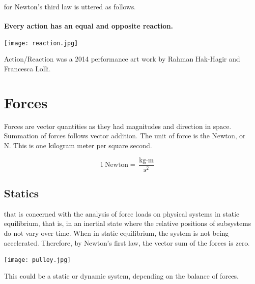 
 for Newton's third law is uttered as follows.\\ \ \\ \textbf{Every action has an equal and opposite reaction.}

\begin{marginfigure}[-40pt]%
  \texttt{[image: reaction.jpg]}
  \caption{Action/Reaction was a 2014 performance art work by Rahman Hak-Hagir and Francesca Lolli.}
  \label{fig:marginfig}
\end{marginfigure}


\newpage

\section{Forces}
Forces are vector quantities as they had magnitudes and direction in space.  Summation of forces follows vector addition.   The unit of force is the Newton, or N.  This is one kilogram meter per square second.  


$$1\ \text{Newton}=\frac{\text{kg}\cdot\text{m}}{\text{s}^2}$$



\subsection{Statics}
 that is concerned with the analysis of force loads on physical systems in static equilibrium, that is, in an inertial state where the relative positions of subsystems do not vary over time.  When in static equilibrium, the system is not being accelerated.  Therefore, by Newton's first law, the vector sum of the forces is zero.

\begin{marginfigure}[-50pt]%
  \texttt{[image: pulley.jpg]}
  \caption{This could be a static or dynamic system, depending on the balance of forces.}
  \label{fig:marginfig}
\end{marginfigure}

